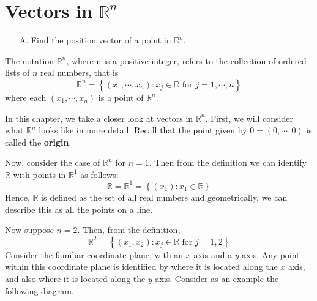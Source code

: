 \section{Vectors in $\mathbb{R}^n$}

\begin{outcome}

\begin{enumerate}
\item[A.] Find the position vector of a point in $\mathbb{R}^n$.
\end{enumerate}
\end{outcome}

The notation $\mathbb{R}^{n}$, where n is a positive integer, refers to the collection of ordered lists of 
$n$ real numbers, that is 
\[
\mathbb{R}^{n} = \left\{ \left( x_{1},\cdots, x_{n}\right)
:x_{j}\in \mathbb{R}\text{ for }j=1,\cdots ,n\right\}
\]
where each $\left( x_{1},\cdots, x_{n}\right)$ is a point of $\mathbb{R}^n$.

In this chapter, we take a closer look at vectors in $\mathbb{R}^n$. First, we will consider what $\mathbb{R}^n$ looks like 
in more detail. Recall that the point given by $0=\left( 0, \cdots, 0 \right)$ is called the \textbf{origin}.

Now, consider the case of $\mathbb{R}^n$ for $n=1.$ Then from the definition we can identify 
$\mathbb{R}$ with points in $\mathbb{R}^{1}$ as follows:
\begin{equation*}
\mathbb{R} = \mathbb{R}^{1}=
 \left\{ \left( x_{1}\right) :x_{1}\in \mathbb{R} \right\}
\end{equation*}
Hence, $\mathbb{R}$ is defined as the set of all real numbers and geometrically,
we can describe this as all the points on a line.

Now suppose $n=2$. Then, from the definition,
\begin{equation*}
\mathbb{R}^{2}=
\left\{ \left(x_{1}, x_{2}\right)
:x_{j}\in \mathbb{R}\text{ for }j=1,2 \right\}
\end{equation*}
Consider the
familiar coordinate plane, with an $x$ axis and a $y$ axis. Any point
within this coordinate plane is identified by where it is located
along the $x$ axis, and also where it is located along the $y$
axis. Consider as an example the following diagram.

\begin{center}
\end{center}

